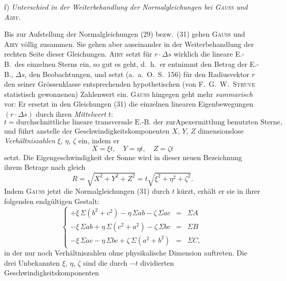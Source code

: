 \documentclass[12pt,a4paper]{article}
\theoremstyle{plain}
\theoremstyle{definition}
\theoremstyle{remark}
\begin{document}
\newpage
\begin{small}
f) \textit{Unterschied in der Weiterbehandlung der Normalgleichungen bei \textsc{Gauss}
und \textsc{Airy}.}

Bis zur Aufstellung der Normalgleichungen (29) bezw.~(31) gehen \textsc{Gauss} und
\textsc{Airy} v\"ollig zusammen. Sie gehen aber auseinander in der Weiterbehandlung
der rechten Seite dieser Gleichungen. \textsc{Airy} setzt f\"ur $r\cdot\Delta s$ wirklich die
lineare E.-B.~des einzelnen Sterns ein, so gut es geht, d.~h.~er entnimmt den
Betrag der E.-B., $\Delta s$, den Beobachtungen, und setzt (a.~a.~O.~S.~156) f\"ur den
Radiusvektor $r$ den seiner Gr\"ossenklasse entsprechenden hypothetischen (von
F.~G.~W.~\textsc{Struve} statistisch gewonnenen) Zahlenwert ein. \textsc{Gauss} hingegen
geht mehr \textit{summarisch} vor: Er ersetzt in den Gleichungen (31) die einzelnen
linearen Eigenbewegungen $(r\cdot\Delta s)$ durch ihren \textit{Mittelwert} $t$:
\begin{equation}\tag{38}
t = \text{durchschnittliche lineare transversale E.-B.~der zur}
\text{Apexermittlung benutzten Sterne},
\end{equation}
und f\"uhrt anstelle der Geschwindigkeitskomponenten $X$, $Y$, $Z$ dimensionslose
\textit{Verh\"altniszahlen} $\xi$, $\eta$, $\zeta$ ein, indem er
\begin{equation}\tag{39}
X = \xi t,\quad Y = \eta t,\quad Z = \zeta t
\end{equation}
setzt. Die Eigengeschwindigkeit der Sonne wird in dieser neuen Bezeichnung ihrem
Betrage nach gleich
\begin{equation}\tag{40}
R = \sqrt{X^{2}+Y^{2}+Z^{2}} = t\sqrt{\xi^{2}+\eta^{2}+\zeta^{2}}.
\end{equation}
Indem \textsc{Gauss} jetzt die Normalgleichungen (31) durch $t$ k\"urzt, erh\"alt er sie
in ihrer folgenden endg\"ultigen Gestalt:
\begin{equation}\tag{41}
\left\{\begin{array}{rcl}
+\xi\,\Sigma(b^{2}+c^{2}) - \eta\,\Sigma ab - \zeta\,\Sigma ac & = & \Sigma A\\
-\xi\,\Sigma ab + \eta\,\Sigma(c^{2}+a^{2}) - \zeta\,\Sigma bc & = & \Sigma B\\
-\xi\,\Sigma ac - \eta\,\Sigma bc + \zeta\,\Sigma(a^{2}+b^{2}) & = & \Sigma C,
\end{array}\right.\end{equation}
in der nur noch Verh\"altniszahlen ohne physikalische Dimension auftreten. Die drei
Unbekannten $\xi$, $\eta$, $\zeta$ sind die durch $-t$ dividierten Geschwindigkeitskomponenten

\end{small}
\end{document}
